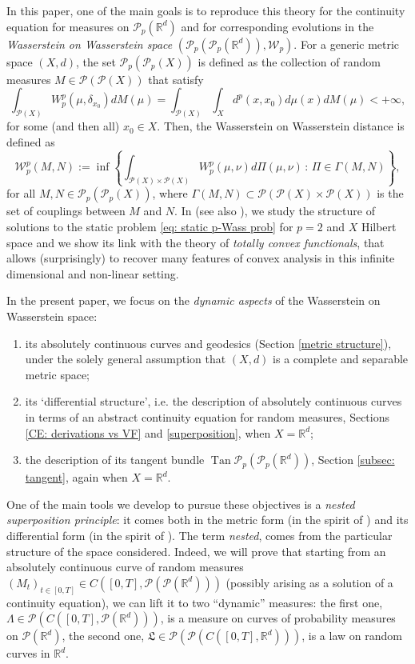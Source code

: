 \documentclass[10pt,leqno]{amsart}
\numberwithin{equation}{section}
\newcommand{\R}{\mathbb{R}}
\newcommand{\PP}{\mathcal{P}}
\begin{document}
In this paper, one of the main goals is to reproduce this theory for the continuity equation for measures on $\PP_p(\R^d)$ 
and for corresponding evolutions in the \textit{Wasserstein on Wasserstein space} $(\PP_p(\PP_p(\R^d)),\mathcal{W}_p)$. For a generic metric space $(X,d)$, the set $\PP_p(\PP_p(X))$ is defined as the collection of random measures $M\in \PP(\PP(X))$ that satisfy
\[\int_{\PP(X)} W_p^p(\mu,\delta_{x_0}) dM(\mu) = \int_{\PP(X)} \int_X d^p(x,x_0) d\mu(x)dM(\mu)<+\infty,\]
for some (and then all) $x_0\in X$. Then, the Wasserstein on Wasserstein distance is defined as 
\begin{equation}\label{eq: static p-Wass prob}
    \mathcal{W}_p^p(M,N) := \inf \left\{ \int_{\PP(X)\times \PP(X)} W_p^p(\mu,\nu)d\Pi(\mu,\nu) \, : \, \Pi \in \Gamma(M,N) \right\},
\end{equation}
for all $M,N\in \PP_p(\PP_p(X))$, where $\Gamma(M,N)\subset \PP(\PP(X)\times \PP(X))$ is the set of couplings between $M$ and $N$. In \cite{PS25convex}
(see also \cite{emami2025optimal, beiglbock2025brenier}), 
we study the 
structure of solutions to the static problem \eqref{eq: static p-Wass prob}
for $p=2$ and $X$ Hilbert space
and we show its link with the theory of \textit{totally convex functionals}, that allows (surprisingly) to recover many features of convex analysis in this infinite dimensional and non-linear setting. 

In the present paper, we focus on the \textit{dynamic aspects} of the Wasserstein on Wasserstein space:
\begin{enumerate}
    \item its absolutely continuous curves and geodesics (Section \ref{metric structure}), under the 
    solely general assumption that $(X,d)$ is a complete and separable metric space;
    \item its `differential structure', i.e. the description of absolutely continuous curves in terms of an abstract continuity equation for random measures, Sections \ref{CE: derivations vs VF} and \ref{superposition}, when $X=\R^d$;
    \item the description of its tangent bundle $\operatorname{Tan}\PP_p(\PP_p(\R^d))$, Section \ref{subsec: tangent}, again when $X=\R^d$.
\end{enumerate}
One of the main tools we 
develop to pursue these objectives is 
a \textit{nested superposition principle}: it comes both in the metric form (in the spirit of \cite{lisini2007characterization}) and its differential form (in the spirit of \cite[Theorem 8.2.1]{ambrosio2005gradient}). The term \textit{nested}, comes from the particular structure of the space considered. Indeed, we will prove that starting from an absolutely continuous curve of random measures $(M_t)_{t\in[0,T]}\in C([0,T],\PP(\PP(\R^d)))$ 
(possibly arising as a solution of a continuity equation), we can lift it to two ``dynamic''
measures: the first one, $\Lambda \in \PP(C([0,T],\PP(\R^d)))$,
is a measure on curves of probability measures
on $\PP(\R^d)$,
the second one, $\mathfrak{L}\in \PP(\PP(C([0,T],\R^d)))$, 
is a law on random curves in $\R^d$. 
\end{document}
